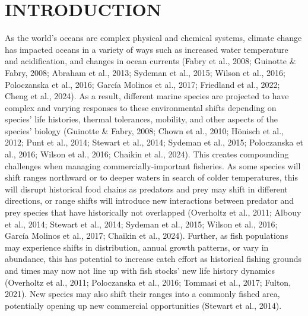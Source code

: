 \documentclass[
  12pt,
]{article}
\begin{document}
\section{INTRODUCTION}\label{introduction}

As the world's oceans are complex physical and chemical systems, climate change has impacted oceans in a variety of ways such as increased water temperature and acidification, and changes in ocean currents (Fabry et al., 2008; Guinotte \& Fabry, 2008; Abraham et al., 2013; Sydeman et al., 2015; Wilson et al., 2016; Poloczanska et al., 2016; García Molinos et al., 2017; Friedland et al., 2022; Cheng et al., 2024). As a result, different marine species are projected to have complex and varying responses to these environmental shifts depending on species' life histories, thermal tolerances, mobility, and other aspects of the species' biology (Guinotte \& Fabry, 2008; Chown et al., 2010; Hönisch et al., 2012; Punt et al., 2014; Stewart et al., 2014; Sydeman et al., 2015; Poloczanska et al., 2016; Wilson et al., 2016; Chaikin et al., 2024). This creates compounding challenges when managing commercially-important fisheries. As some species will shift ranges northward or to deeper waters in search of colder temperatures, this will disrupt historical food chains as predators and prey may shift in different directions, or range shifts will introduce new interactions between predator and prey species that have historically not overlapped (Overholtz et al., 2011; Albouy et al., 2014; Stewart et al., 2014; Sydeman et al., 2015; Wilson et al., 2016; García Molinos et al., 2017; Chaikin et al., 2024). Further, as fish populations may experience shifts in distribution, annual growth patterns, or vary in abundance, this has potential to increase catch effort as historical fishing grounds and times may now not line up with fish stocks' new life history dynamics (Overholtz et al., 2011; Poloczanska et al., 2016; Tommasi et al., 2017; Fulton, 2021). New species may also shift their ranges into a commonly fished area, potentially opening up new commercial opportunities (Stewart et al., 2014).
\end{document}
